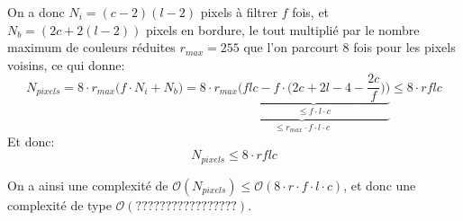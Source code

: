 \documentclass[a4paper, 11pt]{article}
\begin{document}
On a donc $N_i = (c - 2)(l-2)$ pixels à filtrer $f$ fois, et $N_b = (2c + 2(l-2))$ pixels en bordure, le tout multiplié par le nombre maximum de couleurs réduites $r_{max} = 255$ que l'on parcourt 8 fois pour les pixels voisins, ce qui donne:
$$N_{pixels} = 8 \cdot r_{max} \bigg(f \cdot N_i + N_b \bigg)
= 8 \cdot \underbrace{r_{max}\underbrace{\bigg(flc - f \cdot \bigg(2c + 2l - 4 - \frac{2c}{f}\bigg)\bigg)}_{\leq f\cdot l\cdot c}}_{\leq r_{max} \cdot f\cdot l\cdot c} \leq 8\cdot rflc$$
Et donc: $$N_{pixels} \leq 8\cdot rflc$$

On a ainsi une complexité de $\mathcal{O}(N_{pixels}) \leq \mathcal{O}(8\cdot r\cdot f\cdot l\cdot c)$, et donc une complexité de type $\mathcal{O}(?????????????????)$.
\end{document}
